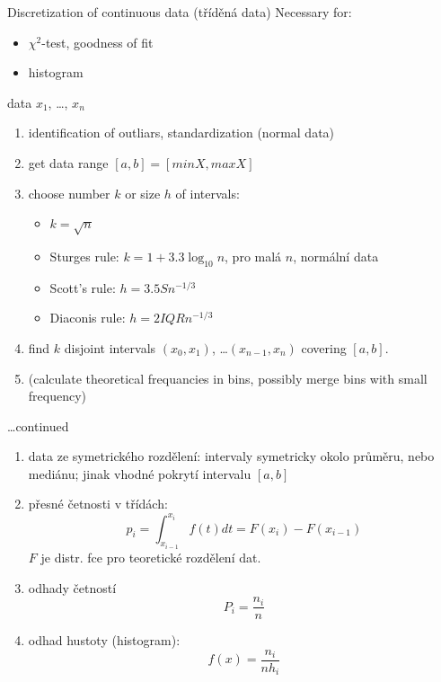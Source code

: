 \documentclass[smaller]{beamer}
\def\xskip{{\vspace{2ex}}}
\def\cz#1{{\small (#1)}}
\begin{document}
\begin{frame}{Discretization of continuous data \cz{tříděná data}}
Necessary for: 
\begin{itemize}
 \item $\chi^2$-test, goodness of fit
 \item histogram
\end{itemize}

\xskip
data $x_1$, \dots, $x_n$
\begin{enumerate}
 \item identification of outliars, standardization (normal data)
 \item get data range $[a,b]=[min X, max X]$
 \item choose number $k$ or size $h$ of intervals:
    \begin{itemize}
     \item $k=\sqrt{n}$
     \item Sturges rule: $k=1+3.3 \log_{10} n$, pro malá $n$, normální data
     \item Scott's rule: $h = 3.5 S n^{-1/3}$
     \item Diaconis rule: $h = 2 IQR n^{-1/3}$
    \end{itemize}
 \item find $k$ disjoint intervals $(x_0, x_1)$, \dots $(x_{n-1}, x_n)$ covering $[a,b]$.
 \item (calculate theoretical frequancies in bins, possibly merge bins with small frequency)
\end{enumerate}
\end{frame}


\begin{frame}{\dots continued}
\begin{enumerate}
 \item data ze symetrického rozdělení: intervaly symetricky okolo průměru, nebo mediánu;
       jinak vhodné pokrytí intervalu $[a,b]$
 \item přesné četnosti v třídách:
       \[
          p_i = \int_{x_{i-1}}^{x_i}f(t) dt = F(x_{i}) - F(x_{i-1})
       \]
       $F$ je distr. fce pro teoretické rozdělení dat.
 \item odhady četností
      \[
        P_i = \frac{n_i}{n}
      \]
 \item odhad hustoty (histogram):
      \[
         f(x)= \frac{n_i}{n h_i}
      \]
\end{enumerate}
\end{frame}
\end{document}
